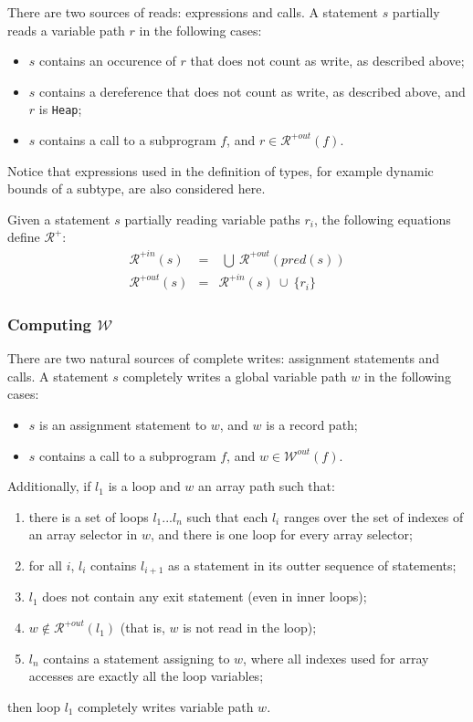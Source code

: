 \documentclass{article}
\newcounter{example}
\newcommand{\code}[1]{\texttt{#1}}
\newcommand{\heap}{\code{Heap}\xspace}
\newcommand{\pred}[1]{\ensuremath{\mathit{pred}(#1)}\xspace}
\newcommand{\writes}{$\mathcal{W}$\xspace}
\newcommand{\outwrites}[1]{\ensuremath{\mathcal{W}^{out}(#1)}\xspace}
\newcommand{\allreads}{$\mathcal{R^+}$\xspace}
\newcommand{\inallreads}[1]{\ensuremath{\mathcal{R}^{+in}(#1)}\xspace}
\newcommand{\outallreads}[1]{\ensuremath{\mathcal{R}^{+out}(#1)}\xspace}
\newcommand{\union}{~\cup~}
\newcommand{\bigunion}{~\bigcup~}
\begin{document}
There are two sources of reads: expressions and calls. A statement $s$
partially reads a variable path $r$ in the following cases:
\begin{itemize}
\item $s$ contains an occurence of $r$ that does not count as write, as
  described above;
\item $s$ contains a dereference that does not count as write, as described
  above, and $r$ is \heap;
\item $s$ contains a call to a subprogram $f$, and $r \in \outallreads{f}$.
\end{itemize}

Notice that expressions used in the definition of types, for example dynamic
bounds of a subtype, are also considered here.

Given a statement $s$ partially reading variable paths $r_i$, the following
equations define \allreads:
\begin{eqnarray*}
\inallreads{s} &=& \bigunion \outallreads{\pred{s}}\\
\outallreads{s} &=& \inallreads{s} \union \{r_i\}
\end{eqnarray*}

\subsubsection{Computing \writes}

There are two natural sources of complete writes: assignment statements and
calls. A statement $s$ completely writes a global variable path $w$ in the
following cases:
\begin{itemize}
\item $s$ is an assignment statement to $w$, and $w$ is a record path;
\item $s$ contains a call to a subprogram $f$, and $w \in \outwrites{f}$.
\end{itemize}
Additionally, if $l_1$ is a loop and $w$ an array path such that:
\begin{enumerate}
\item there is a set of loops $l_1...l_n$ such that each $l_i$ ranges over the
  set of indexes of an array selector in $w$, and there is one loop for every
  array selector;
\item for all $i$, $l_i$ contains
  $l_{i+1}$ as a statement in its outter sequence of statements;
\item $l_1$ does not contain any exit statement (even in inner loops);
\item $w \notin \outallreads{l_1}$ (that is, $w$ is not read in the loop);
\item $l_n$ contains a statement assigning to $w$, where all indexes used for
  array accesses are exactly all the loop variables;
\end{enumerate}
then loop $l_1$ completely writes variable path $w$.
\end{document}
